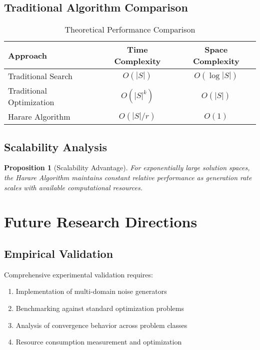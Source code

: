 \documentclass[11pt,a4paper]{article}
\newtheorem{proposition}[theorem]{Proposition}
\theoremstyle{remark}
\begin{document}
\subsection{Traditional Algorithm Comparison}

\begin{table}[h]
\centering
\caption{Theoretical Performance Comparison}
\begin{tabular}{lcc}
\toprule
Approach & Time Complexity & Space Complexity \\
\midrule
Traditional Search & $O(|S|)$ & $O(\log|S|)$ \\
Traditional Optimization & $O(|S|^k)$ & $O(|S|)$ \\
Harare Algorithm & $O(|S|/r)$ & $O(1)$ \\
\bottomrule
\end{tabular}
\end{table}

\subsection{Scalability Analysis}

\begin{proposition}[Scalability Advantage]
For exponentially large solution spaces, the Harare Algorithm maintains constant relative performance as generation rate scales with available computational resources.
\end{proposition}

\section{Future Research Directions}

\subsection{Empirical Validation}

Comprehensive experimental validation requires:
\begin{enumerate}
\item Implementation of multi-domain noise generators
\item Benchmarking against standard optimization problems
\item Analysis of convergence behavior across problem classes
\item Resource consumption measurement and optimization
\end{enumerate}
\end{document}
